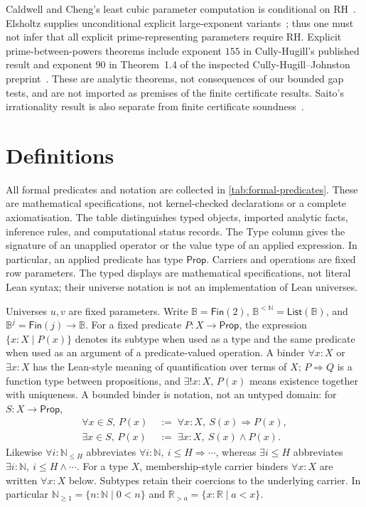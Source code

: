 \documentclass[11pt,reqno]{amsart}
\newcommand{\N}{\mathbb N}
\newcommand{\R}{\mathbb R}
\newcommand{\Np}{\N_{\ge1}}
\theoremstyle{blueplain}
\newcounter{type}
\numberwithin{equation}{section}
\begin{document}
Caldwell and Cheng's least cubic parameter computation is conditional on
RH~\cite{CaldwellCheng2005}. Elsholtz supplies unconditional explicit
large-exponent variants~\cite{Elsholtz2020}; thus one must not infer that
all explicit prime-representing parameters require RH. Explicit
prime-between-powers theorems include exponent \(155\) in Cully-Hugill's
published result and exponent \(90\) in Theorem~1.4 of the inspected
Cully-Hugill--Johnston preprint~\cite{CullyHugill2023,CullyHugillJohnston2026}.
These are analytic theorems, not consequences of our bounded gap tests,
and are not imported as premises of the finite certificate results. Saito's irrationality result is
also separate from finite certificate soundness~\cite{Saito2025}.


\section{Definitions}\label{sec:defs}

All formal predicates and notation are collected in
\cref{tab:formal-predicates}. These are mathematical specifications,
not kernel-checked declarations or a complete axiomatisation.
The table distinguishes typed objects, imported analytic facts,
inference rules, and computational status records.
The Type column gives the signature of an unapplied operator or the value
type of an applied expression. In particular, an applied predicate has type
\(\textsf{Prop}\). Carriers and operations are fixed row parameters.
The typed displays are mathematical specifications, not literal Lean syntax;
their universe notation is not an implementation of Lean universes.

Universes $u,v$ are fixed parameters. Write
$\mathbb B=\textsf{Fin}(2)$, $\mathbb B^{<\N}=\textsf{List}(\mathbb B)$,
and $\mathbb B^j=\textsf{Fin}(j)\to\mathbb B$.
For a fixed predicate $P:X\to\textsf{Prop}$, the expression
$\{x:X\mid P(x)\}$ denotes its subtype when used as a type and the
same predicate when used as an argument of a predicate-valued operation. A binder $\forall x:X$ or
$\exists x:X$ has the Lean-style meaning of quantification over terms of $X$;
$P\Rightarrow Q$ is a function type between propositions, and
$\exists!x:X,\,P(x)$ means existence together with uniqueness.
A bounded binder is notation, not an untyped domain: for $S:X\to\textsf{Prop}$,
\[
\begin{aligned}
\forall x\in S,\,P(x)&\;:=\;\forall x:X,\ S(x)\Rightarrow P(x),\\
\exists x\in S,\,P(x)&\;:=\;\exists x:X,\ S(x)\wedge P(x).
\end{aligned}
\]
Likewise $\forall i:\N_{\le H}$ abbreviates
$\forall i:\N,\ i\le H\Rightarrow\cdots$, whereas
$\exists i\le H$ abbreviates
$\exists i:\N,\ i\le H\wedge\cdots$.
For a type $X$, membership-style carrier binders $\forall x:X$
are written $\forall x:X$ below. Subtypes retain their coercions to the
underlying carrier. In particular $\Np=\{n:\N\mid 0<n\}$ and
$\R_{>a}=\{x:\R\mid a<x\}$.
\end{document}
